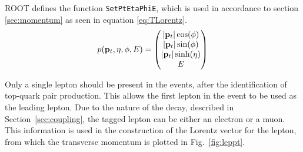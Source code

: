 \documentclass[12pt,a4paper]{article}
\numberwithin{equation}{section}
\begin{document}
ROOT defines the function \texttt{SetPtEtaPhiE}, which is used in accordance to
section \ref{sec:momentum} as seen in equation \eqref{eq:TLorentz}.
\begin{equation} \label{eq:TLorentz}
p({\vb p_t}, \eta, \phi, E) =
\begin{pmatrix}
|{\vb p_t}| \cos(\phi)\\ |{\vb p_t}|\sin(\phi)\\ |{\vb p_t}| \sinh(\eta)\\ E
\end{pmatrix}
\end{equation}

Only a single lepton should be present in the events, after the identification
of top-quark pair production. This allows the first lepton in the event to
be used as the leading lepton. Due to the nature of the decay, described in
Section~\ref{sec:coupling}, the tagged lepton can be either an electron or a
muon. This information is used in the construction of the Lorentz vector for the
lepton, from which the transverse momentum is plotted in Fig.~\ref{fig:leppt}.\\
\end{document}
